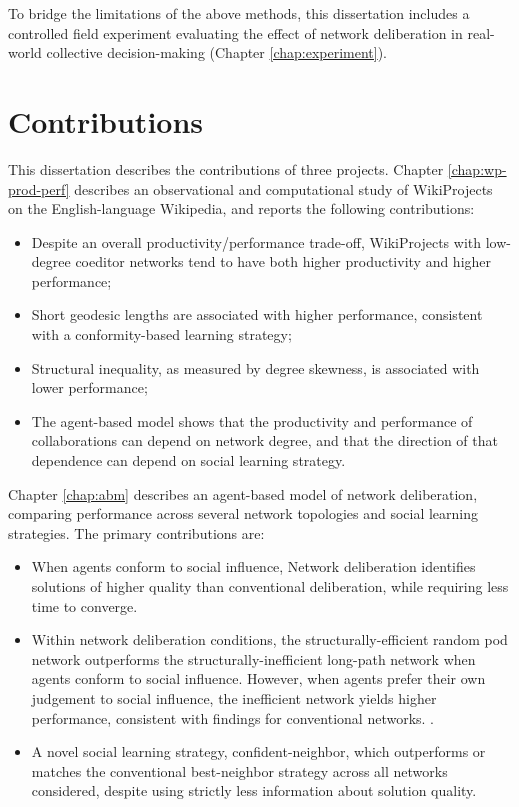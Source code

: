 To bridge the limitations of the above methods,
this dissertation includes a controlled field experiment evaluating the
effect of network deliberation in real-world collective decision-making
(Chapter \ref{chap:experiment}).

\section{Contributions}
This dissertation describes the contributions of three projects.
Chapter \ref{chap:wp-prod-perf} describes an observational and computational
study of WikiProjects on the English-language Wikipedia,
and reports the following contributions:
\begin{itemize}
\setlength\itemsep{0pt}
\item Despite an overall productivity/performance trade-off,
WikiProjects with low-degree coeditor networks tend to have both higher
productivity and higher performance;
\item Short geodesic lengths are associated with higher performance,
consistent with a conformity-based learning strategy;
\item Structural inequality, as measured by degree skewness,
is associated with lower performance;
\item The agent-based model shows that the productivity and performance of
collaborations can depend on network degree,
and that the direction of that dependence can depend on social learning strategy.
\end{itemize}

Chapter \ref{chap:abm} describes an agent-based model of network deliberation,
comparing performance across several network topologies and social learning
strategies.
The primary contributions are:
\begin{itemize}
\setlength\itemsep{0pt}
\item When agents conform to social influence,
Network deliberation identifies solutions of higher quality than
conventional deliberation,
while requiring less time to converge.
\item Within network deliberation conditions,
the structurally-efficient random pod network outperforms the
structurally-inefficient long-path network when agents conform to social influence.
However, when agents prefer their own judgement to social influence,
the inefficient network yields higher performance,
consistent with findings for conventional networks.
\cite{barkoczi_social_2016}.
\item A novel social learning strategy, confident-neighbor,
which outperforms or matches the conventional best-neighbor strategy across all
networks considered,
despite using strictly less information about solution quality.
\end{itemize}

